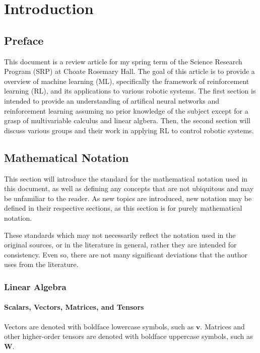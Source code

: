\documentclass[12pt]{report}
\theoremstyle{definition}
\theoremstyle{remark}
\begin{document}


\tableofcontents

\chapter{Introduction}
\section{Preface}
This document is a review article for my spring term of the Science Research Program (SRP) at Choate Rosemary Hall. The goal of this article is to provide a overview of machine learning (ML), specifically the framework of reinforcement learning (RL), and its applications to various robotic systems. The first section is intended to provide an understanding of artifical neural networks and reinforcement learning assuming no prior knowledge of the subject except for a grasp of multivariable calculus and linear algbera. Then, the second section will discuss various groups and their work in applying RL to control robotic systems.

\section{Mathematical Notation}\label{notation}
This section will introduce the standard for the mathematical notation used in this document, as well as defining any concepts that are not ubiquitous and may be unfamiliar to the reader. As new topics are introduced, new notation may be defined in their respective sections, as this section is for purely mathematical notation.

These standards which may not necessarily reflect the notation used in the original sources, or in the literature in general, rather they are intended for consistency. Even so, there are not many significant deviations that the author uses from the literature.

\subsection{Linear Algebra}
\subsubsection{Scalars, Vectors, Matrices, and Tensors}
Vectors are denoted with boldface lowercase symbols, such as $\mathbf{v}$. Matrices and other higher-order tensors are denoted with boldface uppercase symbols, such as $\mathbf{W}$.
\end{document}
